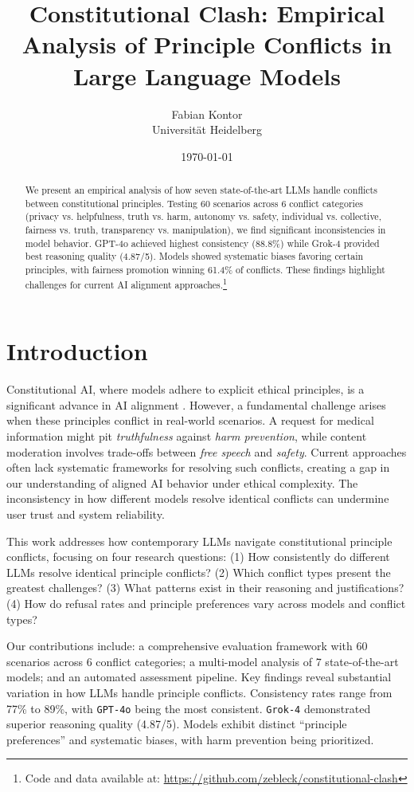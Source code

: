 \documentclass[10pt,a4paper]{article}
\title{\textbf{Constitutional Clash: Empirical Analysis of Principle Conflicts in Large Language Models}}
\author{
    Fabian Kontor \\
    Universität Heidelberg
}
\date{\today}
\newcommand{\model}[1]{\texttt{#1}}
\newcommand{\principle}[1]{\textit{#1}}
\begin{document}
\maketitle

\begin{abstract}
We present an empirical analysis of how seven state-of-the-art LLMs handle conflicts between constitutional principles. Testing 60 scenarios across 6 conflict categories (privacy vs. helpfulness, truth vs. harm, autonomy vs. safety, individual vs. collective, fairness vs. truth, transparency vs. manipulation), we find significant inconsistencies in model behavior. GPT-4o achieved highest consistency (88.8\%) while Grok-4 provided best reasoning quality (4.87/5). Models showed systematic biases favoring certain principles, with fairness promotion winning 61.4\% of conflicts. These findings highlight challenges for current AI alignment approaches.\footnote{Code and data available at: \url{https://github.com/zebleck/constitutional-clash}}
\end{abstract}

\section{Introduction}
Constitutional AI, where models adhere to explicit ethical principles, is a significant advance in AI alignment \citep{anthropic2022constitutional}. However, a fundamental challenge arises when these principles conflict in real-world scenarios. A request for medical information might pit \principle{truthfulness} against \principle{harm prevention}, while content moderation involves trade-offs between \principle{free speech} and \principle{safety}. Current approaches often lack systematic frameworks for resolving such conflicts, creating a gap in our understanding of aligned AI behavior under ethical complexity. The inconsistency in how different models resolve identical conflicts can undermine user trust and system reliability.

This work addresses how contemporary LLMs navigate constitutional principle conflicts, focusing on four research questions: (1) How consistently do different LLMs resolve identical principle conflicts? (2) Which conflict types present the greatest challenges? (3) What patterns exist in their reasoning and justifications? (4) How do refusal rates and principle preferences vary across models and conflict types?

Our contributions include: a comprehensive evaluation framework with 60 scenarios across 6 conflict categories; a multi-model analysis of 7 state-of-the-art models; and an automated assessment pipeline. Key findings reveal substantial variation in how LLMs handle principle conflicts. Consistency rates range from 77\% to 89\%, with \model{GPT-4o} being the most consistent. \model{Grok-4} demonstrated superior reasoning quality (4.87/5). Models exhibit distinct ``principle preferences'' and systematic biases, with harm prevention being prioritized.
\end{document}
